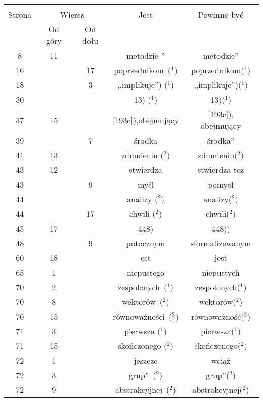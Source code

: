 \documentclass[a4paper,11pt]{article}
\begin{document}
\begin{center}
  \begin{tabular}{|c|c|c|c|c|}
    \hline
    & \multicolumn{2}{c|}{} & & \\
    Strona & \multicolumn{2}{c|}{Wiersz} & Jest
                              & Powinno być \\ \cline{2-3}
    & Od góry & Od dołu & & \\
    \hline
    8   & 11 & & metodzie '' & metodzie'' \\
    16  & & 17 & poprzednikom~($^{ 4 }$) & poprzednikom($^{ 4 }$) \\
    18  & &  3 & ,,implikuje'') ($^{ 1 }$) & ,,implikuje'')($^{ 1 }$) \\
    30  & & & 13) ($^{ 1 }$) & 13)($^{ 1 }$) \\    
    37  & 15 & & [193c]),obejmujący & [193c]), obejmujący \\
    39  & &  7 & środka & środka'' \\
    41  & 13 & & zdumieniu ($^{ 2 }$) & zdumieniu($^{ 2 }$) \\
    43  & 12 & & stwierdza & stwierdza też \\
    43  & &  9 & myśl & pomysł \\
    44  & & & analizy ($^{ 2 }$) & analizy($^{ 2 }$) \\
    44  & & 17 & chwili ($^{ 2 }$) & chwili($^{ 2 }$) \\
    45  & 17 & & 448) & 448)) \\
    48  & &  9 & potocznym & sformalizowanym \\
    60  & 18 & & est & jest \\
    65  &  1 & & niepustego & niepustych \\
    70  &  2 & & zespolonych~($^{ 1 }$) & zespolonych($^{ 1 }$) \\
    70  &  8 & & wektorów~($^{ 2 }$) & wektorów($^{ 2 }$) \\
    70  & 15 & & równoważności~($^{ 3 }$) & równoważność($^{ 3 }$) \\
    71  &  3 & & pierwsza ($^{ 1 }$) & pierwsza($^{ 1 }$) \\
    71  & 15 & & skończonego ($^{ 2 }$) & skończonego($^{ 2 }$) \\
    72  &  1 & & jeszcze & wciąż \\
    72  &  3 & & grup''~($^{ 2 }$) & grup''($^{ 2 }$) \\
    72  &  9 & & abstrakcyjnej~($^{ 2 }$) & abstrakcyjnej($^{ 2 }$) \\

\end{tabular}
\end{center}
\end{document}
